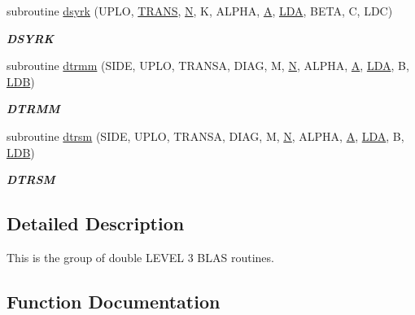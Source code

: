 \begin{DoxyCompactItemize}
subroutine \hyperlink{group__double__blas__level3_gae0ba56279ae3fa27c75fefbc4cc73ddf}{dsyrk} (U\+P\+L\+O, \hyperlink{superlu__enum__consts_8h_a0c4e17b2d5cea33f9991ccc6a6678d62a1f61e3015bfe0f0c2c3fda4c5a0cdf58}{T\+R\+A\+N\+S}, \hyperlink{polmisc_8c_a0240ac851181b84ac374872dc5434ee4}{N}, K, A\+L\+P\+H\+A, \hyperlink{classA}{A}, \hyperlink{example__user_8c_ae946da542ce0db94dced19b2ecefd1aa}{L\+D\+A}, B\+E\+T\+A, C, L\+D\+C)
\begin{DoxyCompactList}\small\item\em {\bfseries D\+S\+Y\+R\+K} \end{DoxyCompactList}\item 
subroutine \hyperlink{group__double__blas__level3_gaf07edfbb2d2077687522652c9e283e1e}{dtrmm} (S\+I\+D\+E, U\+P\+L\+O, T\+R\+A\+N\+S\+A, D\+I\+A\+G, M, \hyperlink{polmisc_8c_a0240ac851181b84ac374872dc5434ee4}{N}, A\+L\+P\+H\+A, \hyperlink{classA}{A}, \hyperlink{example__user_8c_ae946da542ce0db94dced19b2ecefd1aa}{L\+D\+A}, B, \hyperlink{example__user_8c_a50e90a7104df172b5a89a06c47fcca04}{L\+D\+B})
\begin{DoxyCompactList}\small\item\em {\bfseries D\+T\+R\+M\+M} \end{DoxyCompactList}\item 
subroutine \hyperlink{group__double__blas__level3_ga6a0a7704f4a747562c1bd9487e89795c}{dtrsm} (S\+I\+D\+E, U\+P\+L\+O, T\+R\+A\+N\+S\+A, D\+I\+A\+G, M, \hyperlink{polmisc_8c_a0240ac851181b84ac374872dc5434ee4}{N}, A\+L\+P\+H\+A, \hyperlink{classA}{A}, \hyperlink{example__user_8c_ae946da542ce0db94dced19b2ecefd1aa}{L\+D\+A}, B, \hyperlink{example__user_8c_a50e90a7104df172b5a89a06c47fcca04}{L\+D\+B})
\begin{DoxyCompactList}\small\item\em {\bfseries D\+T\+R\+S\+M} \end{DoxyCompactList}\end{DoxyCompactItemize}


\subsection{Detailed Description}
This is the group of double L\+E\+V\+E\+L 3 B\+L\+A\+S routines. 

\subsection{Function Documentation}
\hypertarget{group__double__blas__level3_gaeda3cbd99c8fb834a60a6412878226e1}{}
